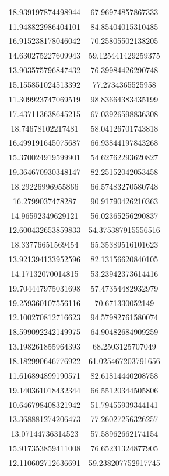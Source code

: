 \begin{table}
\begin{tabular}{cc}
18.939197874498944 & 67.96974857867333 \\
11.948822986404101 & 84.85404015310485 \\
16.915238178046042 & 70.25805502138205 \\
14.630275227609943 & 59.125441429259375 \\
13.903575796847432 & 76.39984426290748 \\
15.155851024513392 & 77.2734365525958 \\
11.309923747069519 & 98.83664383435199 \\
17.437113638645215 & 67.03926598836308 \\
18.74678102217481 & 58.04126701743818 \\
16.499191645075687 & 66.93844197843268 \\
15.370024919599901 & 54.62762293620827 \\
19.364670930348147 & 82.25152042053458 \\
18.29226996955866 & 66.57483270580748 \\
16.2799037478287 & 90.91790426210363 \\
14.96592349629121 & 56.02365256290837 \\
12.600432653859833 & 54.375387915556516 \\
18.33776651569454 & 65.35389516101623 \\
13.921394133952596 & 82.13156620840105 \\
14.17132070014815 & 53.23942373614416 \\
19.704447975031698 & 57.47354482932979 \\
19.259360107556116 & 70.671330052149 \\
12.100270812716623 & 94.57982761580074 \\
18.599092242149975 & 64.90482684909259 \\
13.198261855964393 & 68.2503125707049 \\
18.182990646776922 & 61.025467203791656 \\
11.616894899190571 & 82.61814440208758 \\
19.140361018432344 & 66.55120344505806 \\
10.646798408321942 & 51.79455939344141 \\
13.368881274206473 & 77.26027256326257 \\
13.07144736314523 & 57.58962662174154 \\
15.917353859411008 & 76.65231324877905 \\
12.110602712636691 & 59.238207752917745 \\

\end{tabular}
\end{table}

